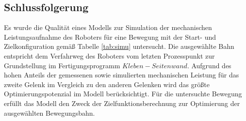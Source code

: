 \subsection*{Schlussfolgerung}
Es wurde die Qualität eines Modells zur Simulation der mechanischen Leistungsaufnahme des Roboters für eine Bewegung mit der Start- und Zielkonfiguration gemäß Tabelle \ref{tab:simu} untersucht. Die ausgewählte Bahn entspricht dem Verfahrweg des Roboters vom letzten Prozesspunkt zur Grundstellung im Fertigungsprogramm $Kleben-Seitenwand$. Aufgrund des hohen Anteils der gemessenen sowie simulierten mechanischen Leistung für das zweite Gelenk im Vergleich zu den anderen Gelenken wird das größte Optimierungspotenzial im Modell berücksichtigt. Für die untersuchte Bewegung erfüllt das Modell den Zweck der Zielfunktionsberechnung zur Optimierung der ausgewählten Bewegungsbahn.
%